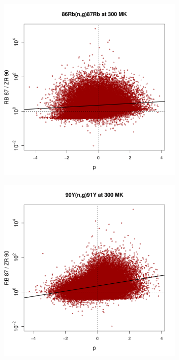 \begin{figure}[t]
\centering
\begin{subfigure}[b]{0.495\textwidth}
\centering
\includegraphics[width=\textwidth]{Chapter-3/figs/CorrRB87ZR90_86Rb_n_g_87Rb_300MK.png}  
\end{subfigure}
\hfill
\begin{subfigure}[b]{0.495\textwidth}  
\centering 
\includegraphics[width=\textwidth]{Chapter-3/figs/CorrRB87ZR90_90Y_n_g_91Y_300MK.png}

\end{subfigure}
\end{figure}
